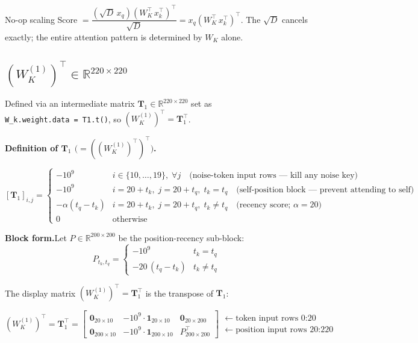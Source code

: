 \documentclass[11pt]{article}
\newcommand{\R}{\mathbb{R}}
\begin{document}
\begin{notebox}{No-op scaling}
Score $=\dfrac{(\sqrt{D}\,x_q)(W_K^\top\,x_k^\top)^\top}{\sqrt{D}}=x_q(W_K^\top\,x_k^\top)^\top$.
The $\sqrt{D}$ cancels exactly; the entire attention pattern is determined by $W_K$ alone.
\end{notebox}

\subsection{$(W_K^{(1)})^\top\in\R^{220\times 220}$}

Defined via an intermediate matrix $\boldsymbol{T}_1\in\R^{220\times220}$ set as
\texttt{W\_k.weight.data~=~T1.t()}, so $(W_K^{(1)})^\top=\boldsymbol{T}_1^\top$.

\medskip
\textbf{Definition of $\boldsymbol{T}_1$ $\bigl(=((W_K^{(1)})^\top)^\top\bigr)$.}

\[
[\boldsymbol{T}_1]_{i,j}=\begin{cases}
-10^9 & i\in\{10,\ldots,19\},\;\forall j
        \quad\text{(noise-token input rows --- kill any noise key)}\\
-10^9 & i=20{+}t_k,\;j=20{+}t_q,\;t_k=t_q
        \quad\text{(self-position block --- prevent attending to self)}\\
-\alpha(t_q-t_k) & i=20{+}t_k,\;j=20{+}t_q,\;t_k\neq t_q
        \quad\text{(recency score; }\alpha=20\text{)}\\
0 & \text{otherwise}
\end{cases}
\tag{3}
\]

\textbf{Block form.}\quad Let $P\in\R^{200\times200}$ be the position-recency sub-block:
\[
P_{t_k,t_q}=\begin{cases}-10^9 & t_k=t_q\\-20\,(t_q-t_k) & t_k\neq t_q\end{cases}
\tag{4}
\]

The display matrix $(W_K^{(1)})^\top=\boldsymbol{T}_1^\top$ is the transpose of $\boldsymbol{T}_1$:

\begin{equation}
\boxed{
(W_K^{(1)})^\top = \boldsymbol{T}_1^\top =
\begin{bmatrix}
\mathbf{0}_{20\times10}   & -10^9\cdot\mathbf{1}_{20\times10}   & \mathbf{0}_{20\times200}\\[4pt]
\mathbf{0}_{200\times10}  & -10^9\cdot\mathbf{1}_{200\times10}  & P^\top_{200\times200}
\end{bmatrix}
}
\begin{array}{l}
\leftarrow\text{token input rows }0\text{:}20\\[4pt]
\leftarrow\text{position input rows }20\text{:}220
\end{array}
\tag{5}
\end{equation}
\end{document}
